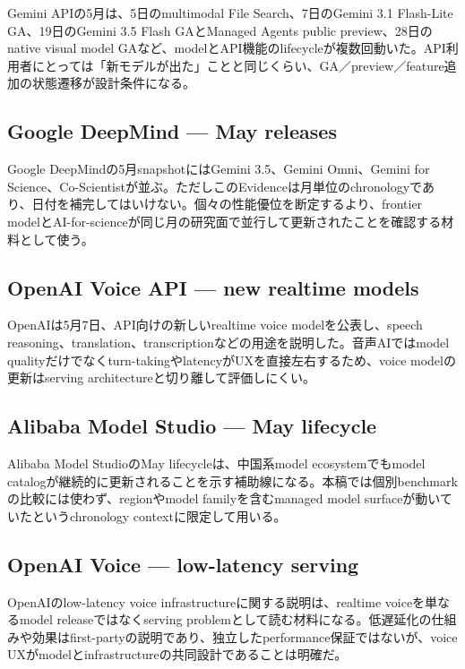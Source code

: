 Gemini APIの5月は、5日のmultimodal File Search、7日のGemini 3.1 Flash-Lite GA、19日のGemini 3.5 Flash GAとManaged Agents public preview、28日のnative visual model GAなど、modelとAPI機能のlifecycleが複数回動いた。API利用者にとっては「新モデルが出た」ことと同じくらい、GA／preview／feature追加の状態遷移が設計条件になる。\autocite{src-a24fd97eb3d0}


\subsection{Google DeepMind — May releases}

Google DeepMindの5月snapshotにはGemini 3.5、Gemini Omni、Gemini for Science、Co-Scientistが並ぶ。ただしこのEvidenceは月単位のchronologyであり、日付を補完してはいけない。個々の性能優位を断定するより、frontier modelとAI-for-scienceが同じ月の研究面で並行して更新されたことを確認する材料として使う。\autocite{src-dd5d9b8662f3}


\subsection{OpenAI Voice API — new realtime models}

OpenAIは5月7日、API向けの新しいrealtime voice modelを公表し、speech reasoning、translation、transcriptionなどの用途を説明した。音声AIではmodel qualityだけでなくturn-takingやlatencyがUXを直接左右するため、voice modelの更新はserving architectureと切り離して評価しにくい。\autocite{src-24a3c172de48}


\subsection{Alibaba Model Studio — May lifecycle}

Alibaba Model StudioのMay lifecycleは、中国系model ecosystemでもmodel catalogが継続的に更新されることを示す補助線になる。本稿では個別benchmarkの比較には使わず、regionやmodel familyを含むmanaged model surfaceが動いていたというchronology contextに限定して用いる。\autocite{src-eac8dfbeb78c}


\subsection{OpenAI Voice — low-latency serving}

OpenAIのlow-latency voice infrastructureに関する説明は、realtime voiceを単なるmodel releaseではなくserving problemとして読む材料になる。低遅延化の仕組みや効果はfirst-partyの説明であり、独立したperformance保証ではないが、voice UXがmodelとinfrastructureの共同設計であることは明確だ。\autocite{src-5c3d93bd7160}


